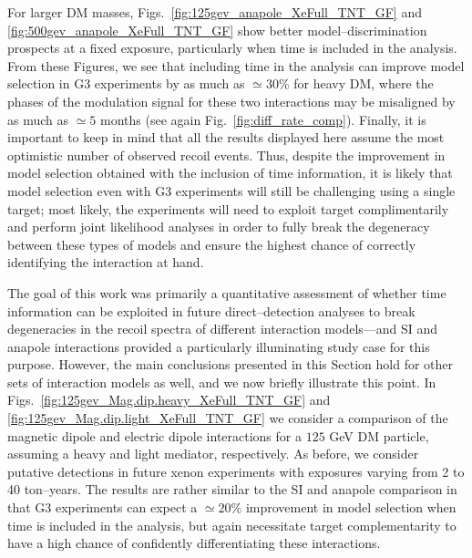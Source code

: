 \documentclass[11pt]{article}
\newcommand{\Fig}[1]{Fig.~\ref{#1}} \newcommand{\Figs}[2]{Figs.~\ref{#1} and \ref{#2}}
\begin{document}
For larger DM masses, Figs.~\ref{fig:125gev_anapole_XeFull_TNT_GF} and \ref{fig:500gev_anapole_XeFull_TNT_GF} show better model--discrimination prospects at a fixed exposure, particularly when time is included in the analysis. From these Figures, we see that including time in the analysis can improve model selection in G3 experiments by as much as $\simeq 30\%$ for heavy DM, where the phases of the modulation signal for these two interactions may be misaligned by as much as $\simeq 5$ months (see again \Fig{fig:diff_rate_comp}). Finally, it is important to keep in mind that all the results displayed here assume the most optimistic number of observed recoil events. Thus, despite the improvement in model selection obtained with the inclusion of time information, it is likely that model selection even with G3 experiments will still be challenging using a single target; most likely, the experiments will need to exploit target complimentarily and perform joint likelihood analyses in order to fully break the degeneracy between these types of models and ensure the highest chance of correctly identifying the interaction at hand. 

The goal of this work was primarily a quantitative assessment of whether time information can be exploited in future direct--detection analyses to break degeneracies in the recoil spectra of different interaction models---and SI and anapole interactions provided a particularly illuminating study case for this purpose. However, the main conclusions presented in this Section hold for other sets of interaction models as well, and we now briefly illustrate this point. In \Figs{fig:125gev_Mag.dip.heavy_XeFull_TNT_GF}{fig:125gev_Mag.dip.light_XeFull_TNT_GF} we consider a comparison of the magnetic dipole and electric dipole interactions for a $125$ GeV DM particle, assuming a heavy and light mediator, respectively. As before, we consider putative detections in future xenon experiments with exposures varying from 2 to 40 ton--years. The results are rather similar to the SI and anapole comparison in that G3 experiments can expect a $\simeq 20\%$ improvement in model selection when time is included in the analysis, but again necessitate target complementarity to have a high chance of confidently differentiating these interactions.

\end{document}
